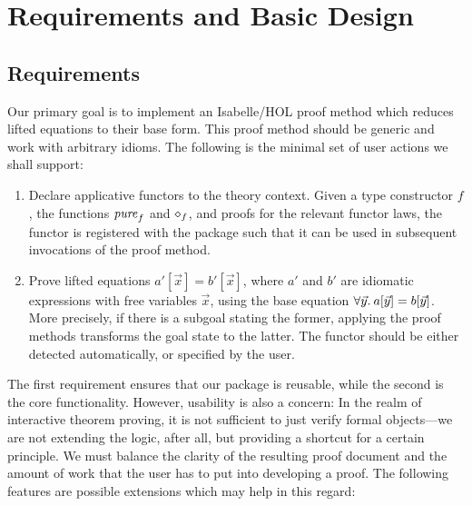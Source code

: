 \section{Requirements and Basic Design}\label{sec:design}

\subsection{Requirements}

Our primary goal is to implement an Isabelle/HOL proof method which reduces
lifted equations to their base form.
This proof method should be generic and work with arbitrary idioms.
The following is the minimal set of user actions we shall support:

\begin{enumerate}
\item Declare applicative functors to the theory context.
	Given a type constructor $f$, the functions $\operatorname{\mathit{pure}}_f$ and $\diamond_f$, and
	proofs for the relevant functor laws, the functor is registered with the
	package such that it can be used in subsequent invocations of the
	proof method.
\item Prove lifted equations $a'[\vec{x}] = b'[\vec{x}]$, where $a'$ and $b'$
	are idiomatic expressions with free variables $\vec{x}$, using the base
	equation $\forall \vec{y}.\>a[\vec{y}] = b[\vec{y}]$.
	More precisely, if there is a subgoal stating the former, applying the
	proof methods transforms the goal state to the latter.
	The functor should be either detected automatically, or specified by
	the user.
\end{enumerate}

The first requirement ensures that our package is reusable, while the second
is the core functionality.
However, usability is also a concern: In the realm of interactive theorem
proving, it is not sufficient to just verify formal objects---we are not
extending the logic, after all, but providing a shortcut for a certain
principle.
We must balance the clarity of the resulting proof document and the amount of
work that the user has to put into developing a proof.
The following features are possible extensions which may help in this regard:


